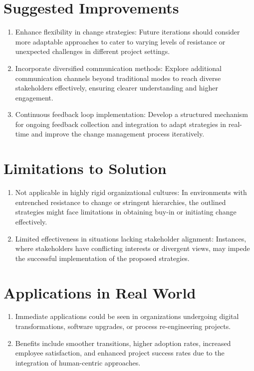 \documentclass[11pt,letterpaper]{report}
\begin{document}
\section{Suggested Improvements}
\begin{enumerate}
\item Enhance flexibility in change strategies: Future iterations should consider more adaptable approaches to cater to varying levels of resistance or unexpected challenges in different project settings.
\item Incorporate diversified communication methods: Explore additional communication channels beyond traditional modes to reach diverse stakeholders effectively, ensuring clearer understanding and higher engagement.\cite{}
\item Continuous feedback loop implementation: Develop a structured mechanism for ongoing feedback collection and integration to adapt strategies in real-time and improve the change management process iteratively.
\end{enumerate}


\section{Limitations to Solution}
\begin{enumerate}
\item Not applicable in highly rigid organizational cultures: In environments with entrenched resistance to change or stringent hierarchies, the outlined strategies might face limitations in obtaining buy-in or initiating change effectively.
\item Limited effectiveness in situations lacking stakeholder alignment: Instances, where stakeholders have conflicting interests or divergent views, may impede the successful implementation of the proposed strategies.
\end{enumerate}


\section{Applications in Real World}
\begin{enumerate}
\item Immediate applications could be seen in organizations undergoing digital transformations, software upgrades, or process re-engineering projects.
\item Benefits include smoother transitions, higher adoption rates, increased employee satisfaction, and enhanced project success rates due to the integration of human-centric approaches.
\end{enumerate}
\end{document}
